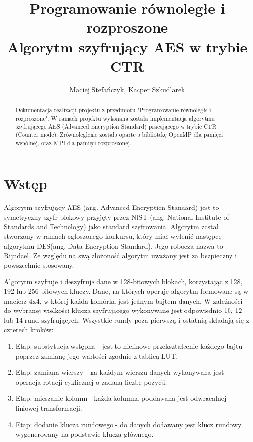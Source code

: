 \documentclass[a4paper,12pt]{article}
\begin{document}
\title{{\small Programowanie równoległe i rozproszone}\\Algorytm szyfrujący AES w trybie CTR}
\author{Maciej Stefańczyk, Kacper Szkudlarek}

\maketitle

\begin{abstract}
Dokumentacja realizacji projektu z przedmiotu "Programowanie równoległe i rozproszone". W ramach projektu wykonana została implementacja algorytmu szyfrującego AES (Advanced Encryption Standard) pracującego w trybie CTR (Counter mode). Zrównoleglenie zostało oparte o bibliotekę OpenMP dla pamięci wspólnej, oraz MPI dla pamięci rozproszonej.
\end{abstract}


\section{Wstęp}
Algorytm szyfrujący AES (ang. Advanced Encryption Standard) jest to symetryczny szyfr blokowy przyjęty przez NIST (ang. National Institute of Standards and Technology) jako standard szyfrowania. Algorytm został stworzony w ramach ogłoszonego konkursu, który miał wyłonić następcę algorytmu DES(ang. Data Encryption Standard). Jego robocza nazwa to Rijndael. Ze względu na swą złożoność algorytm uważany jest za bezpieczny i powszechnie stosowany.

Algorytm szyfruje i deszyfruje dane w 128-bitowych blokach, korzystając z 128, 192 lub 256 bitowych kluczy. Dane, na których operuje algorytm formowane są w macierz 4x4, w której każda komórka jest jednym bajtem danych. W zależności do wybranej wielkości klucza szyfrującego wykonywane jest odpowiednio 10, 12 lub 14 rund szyfrujących. Wszystkie rundy poza pierwszą i ostatnią składają się z czterech kroków:
\begin{enumerate}
\item Etap: substytucja wstępna  - jest to nielinowe przekształcenie każdego bajtu poprzez zamianę jego wartości zgodnie z tablicą LUT.
\item Etap: zamiana wierszy - na każdym wierszu danych wykonywana jest operacja rotacji cyklicznej o zadaną liczbę pozycji.
\item Etap: mieszanie kolumn - każda kolumna poddawana jest odwracalnej liniowej transformacji.
\item Etap: dodanie klucza rundowego - do danych dodawany jest klucz rundowy wygenerowany na podstawie klucza głównego.
\end{enumerate}
\end{document}

